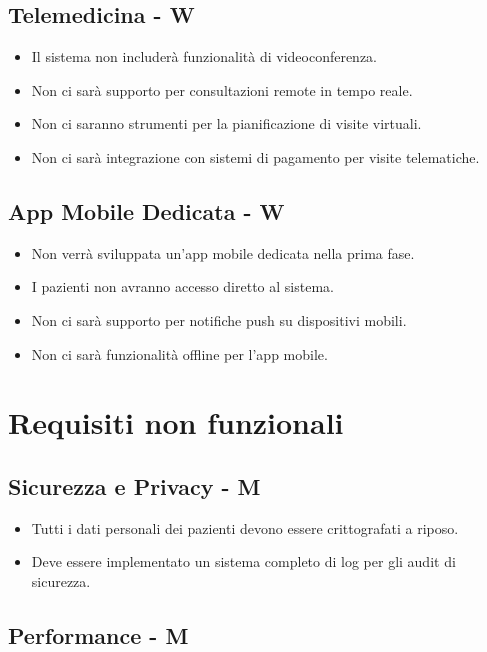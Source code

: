 \documentclass[12pt,a4paper,oneside]{report}
\begin{document}
\subsection{Telemedicina  - W}

\begin{itemize}
    \item Il sistema non includerà funzionalità di videoconferenza.
    \item Non ci sarà supporto per consultazioni remote in tempo reale.
    \item Non ci saranno strumenti per la pianificazione di visite virtuali.
    \item Non ci sarà integrazione con sistemi di pagamento per visite telematiche.
\end{itemize}

\subsection{App Mobile Dedicata  - W}

\begin{itemize}
    \item Non verrà sviluppata un'app mobile dedicata nella prima fase.
    \item I pazienti non avranno accesso diretto al sistema.
    \item Non ci sarà supporto per notifiche push su dispositivi mobili.
    \item Non ci sarà funzionalità offline per l'app mobile.
\end{itemize}


\section{Requisiti non funzionali}

\subsection{Sicurezza e Privacy - M}

\begin{itemize}
    \item Tutti i dati personali dei pazienti devono essere crittografati a riposo.
    \item Deve essere implementato un sistema completo di log per gli audit di sicurezza.
\end{itemize}

\subsection{Performance  - M}
\end{document}

